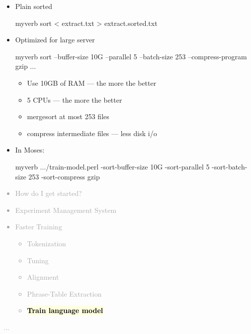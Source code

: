 \documentclass[landscape]{uedslides2C}
\newcommand{\currenttopic}[1]{\colorbox{lightyellow}{\textcolor{black}{\bf #1}}}
\begin{document}
\vspace{-5mm}
  \begin{itemize} \itemsep -1mm 
  \item Plain sorted\\[2mm]
  \begin{SaveVerbatim}{myverb}
 sort < extract.txt > extract.sorted.txt
  \end{SaveVerbatim}
  \colorbox{gray}{}

  \item Optimized for large server\\[2mm]
  \begin{SaveVerbatim}{myverb}
 sort --buffer-size 10G --parallel 5
      --batch-size 253 --compress-program gzip ...
  \end{SaveVerbatim}
  \colorbox{gray}{}
    \begin{itemize}
    \item Use 10GB of RAM --- the more the better
    \item 5 CPUs --- the more the better
    \item merge\-sort at most 253 files
    \item compress intermediate files --- less disk i/o
    \end{itemize}

\item In Moses:\\[2mm]
    \begin{SaveVerbatim}{myverb}
 .../train-model.perl -sort-buffer-size 10G -sort-parallel 5 
      -sort-batch-size 253 -sort-compress gzip 
    \end{SaveVerbatim}
    \colorbox{gray}{}

  \end{itemize}



\vspace{-5mm}
\textcolor{darkgrey}{
\begin{itemize} \itemsep -1mm
\item {How do I get started?}
\item {Experiment Management System}
\item {Faster Training}
  \begin{itemize}
  \item {Tokenization}
  \item {Tuning}
  \item {Alignment}
  \item {Phrase-Table Extraction}
  \item \currenttopic{Train language model}
  \end{itemize}
\end{itemize}
...
}
\end{document}
